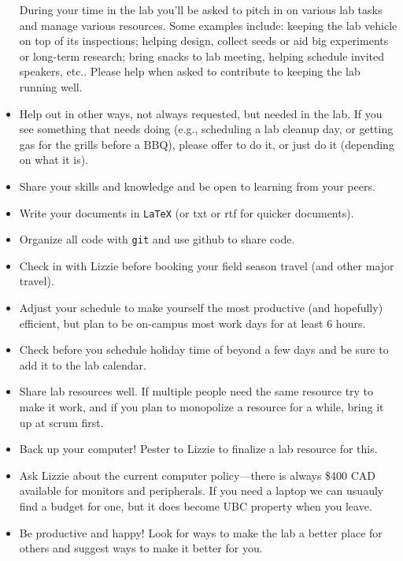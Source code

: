 \documentclass[11pt,a4paper,oneside]{article}
\begin{document}
\begin{itemize}
During your time in the lab you'll be asked to pitch in on various lab tasks and manage various resources. Some examples include: keeping the lab vehicle on top of its inspections; helping design, collect seeds or aid big experiments or long-term research; bring snacks to lab meeting, helping schedule invited speakers, etc.. Please help when asked to contribute to keeping the lab running well. 
\item Help out in other ways, not always requested, but needed in the lab. If you see something that needs doing (e.g., scheduling a lab cleanup day, or getting gas for the grills before a BBQ), please offer to do it, or just do it (depending on what it is). 
\item Share your skills and knowledge and be open to learning from your peers. 
\item Write your documents in \verb|LaTeX| (or txt or rtf for quicker documents).
\item Organize all code with \verb|git| and use github to share code.
\item Check in with Lizzie before booking your field season travel (and other major travel). 
\item Adjust your schedule to make yourself the most productive (and hopefully) efficient, but plan to be on-campus most work days for at least 6 hours.
\item Check before you schedule holiday time of beyond a few days and be sure to add it to the lab calendar.
\item Share lab resources well. If multiple people need the same resource try to make it work, and if you plan to monopolize a resource for a while, bring it up at scrum first. 
\item Back up your computer! Pester to Lizzie to finalize a lab resource for this.
\item Ask Lizzie about the current computer policy---there is always \$400 CAD available for monitors and peripherals. If you need a laptop we can usuauly find a budget for one, but it does become UBC property when you leave. 
\item Be productive and happy! Look for ways to make the lab a better place for others and suggest ways to make it better for you. 
\end{itemize}

% 
\end{document}
